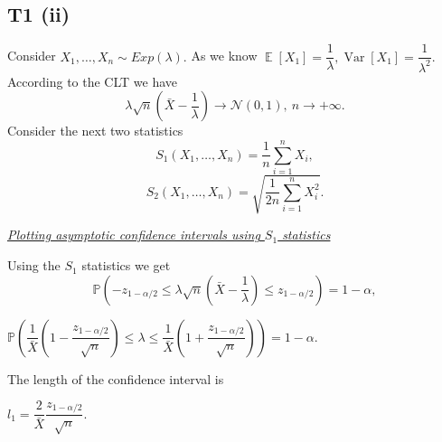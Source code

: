 \documentclass[a4paper, 12pt]{article}
\DeclareMathOperator*{\E}{\mathbb{E}}
\DeclareMathOperator*{\Var}{\text{Var}}
\renewcommand*{\P}{\mathbb{P}}
\begin{document}
\subsection*{T1 (ii)}

Consider $X_1, \ldots, X_n \sim Exp(\lambda).$ As we know $\E [X_1] = \dfrac{1}{\lambda}, \Var [X_1] = \dfrac{1}{\lambda^2}.$
According to the CLT we have
$$
\lambda \sqrt{n} \left( \bar{X} - \dfrac{1}{\lambda} \right) \rightarrow \mathcal{N}(0, 1), ~ n \rightarrow + \infty.
$$
Consider the next two statistics 
$$
S_1(X_1, \ldots, X_n) = \dfrac{1}{n} \sum \limits_{i=1}^n X_i,
$$
$$
S_2(X_1, \ldots, X_n) = \sqrt{\dfrac{1}{2n} \sum \limits_{i=1}^n X_i^2}.
$$
\begin{center}
\large \itshape \underline{Plotting asymptotic confidence intervals using $S_1$ statistics}
\end{center}
Using the $S_1$ statistics we get
$$
\P \left( -z_{1 - \alpha/2} \leqslant \lambda \sqrt{n} \left( \bar{X} - \dfrac{1}{\lambda} \right) \leqslant z_{1- \alpha/2} \right) = 1 - \alpha,
$$
\begin{tcolorbox}
[enhanced,width=\textwidth,center upper,
 fontupper=\large\bfseries,
 drop fuzzy shadow southeast,
 colframe=red!50!black,colback=yellow!25]
$
\P \left( \dfrac{1}{\bar{X}} \left( 1 - \dfrac{z_{1 - \alpha/2}}{\sqrt{n}} \right) \leqslant \lambda \leqslant \dfrac{1}{\bar{X}} \left( 1 + \dfrac{z_{1 - \alpha/2}}{\sqrt{n}} \right) \right) = 1 - \alpha.
$
\end{tcolorbox}
The length of the confidence interval is
\begin{tcolorbox}
[enhanced,width=\textwidth,center upper,
 fontupper=\large\bfseries,
 drop fuzzy shadow southeast,
 colframe=red!50!black,colback=yellow!25]
$
l_1 = \dfrac{2}{\bar{X}} \dfrac{z_{1 - \alpha/2}}{\sqrt{n}}.
$
\end{tcolorbox}
\end{document}
